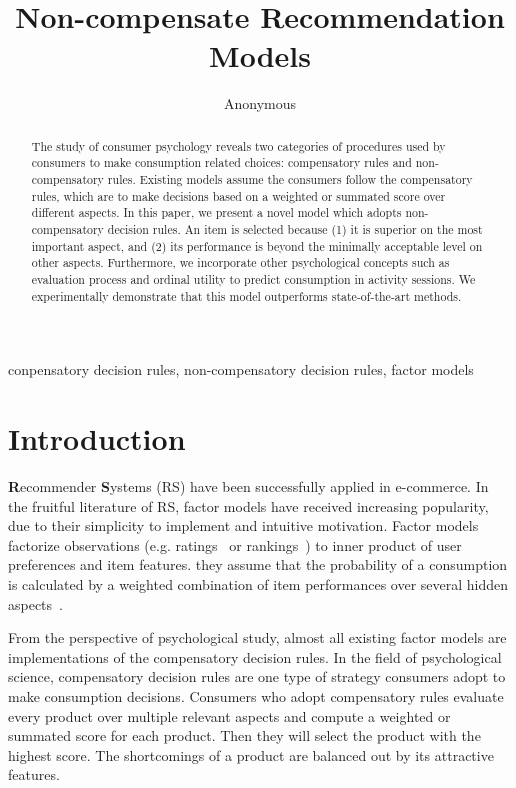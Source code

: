 \documentclass[conference]{IEEEtran}
\begin{document}
\title{Non-compensate Recommendation Models
}

\author{Anonymous
}

\maketitle

\begin{abstract}
The study of consumer psychology reveals two categories of procedures used by consumers to make consumption related choices: compensatory rules and non-compensatory rules. Existing models assume the consumers follow the compensatory rules, which are to make decisions based on a weighted or summated score over different aspects. In this paper, we present a novel model which adopts non-compensatory decision rules. An item is selected because  (1) it is superior on the most important aspect, and (2) its performance is beyond the minimally acceptable level on other aspects. Furthermore, we incorporate other psychological concepts such as evaluation process and ordinal utility to predict consumption in activity sessions. We experimentally demonstrate that this model outperforms state-of-the-art methods.
\end{abstract}

\begin{IEEEkeywords}
conpensatory decision rules, non-compensatory decision rules, factor models 
\end{IEEEkeywords}

\section{Introduction}\label{sec:introduction}
\textbf{R}ecommender \textbf{S}ystems (RS) have been successfully applied in e-commerce. In the fruitful literature of RS, factor models have received increasing popularity, due to their simplicity to implement and intuitive motivation. Factor models factorize observations (e.g. ratings~\cite{} or rankings~\cite{}) to inner product of user preferences and item features. they assume that the probability of a consumption is calculated by a weighted combination of item performances over several hidden aspects~\cite{Gopalan2015Scalable,Hu2008Collaborative}.


From the perspective of psychological study, almost all existing factor models are implementations of the compensatory decision rules. In the field of psychological science, compensatory decision rules are one type of strategy consumers adopt to make consumption decisions.  Consumers who adopt compensatory rules evaluate every product over multiple relevant aspects and compute a weighted or summated score for each product. Then they will select the product with the highest score. The shortcomings of a product are balanced out by its attractive features.  
\end{document}
